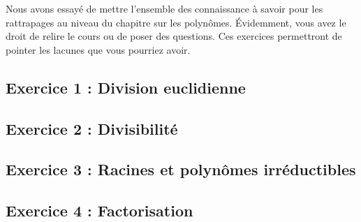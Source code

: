 \noindent Nous avons essayé de mettre l'ensemble des connaissance à savoir pour les rattrapages au niveau du chapitre sur les polynômes. Évidemment, vous avez le droit de relire le cours ou de poser des questions. Ces exercices permettront de pointer les lacunes que vous pourriez avoir.

\subsection{Exercice 1 : Division euclidienne}

\vspace{10px}

\subsection{Exercice 2 : Divisibilité}

\vspace{10px}

\subsection{Exercice 3 : Racines et polynômes irréductibles}

\vspace{10px}

\subsection{Exercice 4 : Factorisation}

\vspace{10px}
